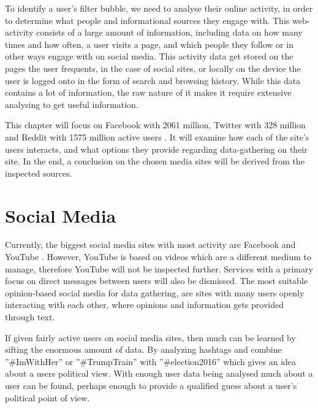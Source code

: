 
To identify a user's filter bubble, we need to analyse their online activity, in
order to determine what people and informational sources they engage with. This
web-activity consists of a large amount of information, including data on how
many times and how often, a user visits a page, and which people they follow or
in other ways engage with on social media. This activity data get stored on the
pages the user frequents, in the case of social sites, or locally on the device
the user is logged onto in the form of search and browsing history. While this
data contains a lot of information, the raw nature of it makes it require
extensive analysing to get useful information.\nl


This chapter will focus on Facebook with 2061 million, Twitter with 328 million
and Reddit with 1575 million active users \citep{SocialMediaStats, RedditStats}.
It will examine how each of the site's users interacts, and what options they
provide regarding data-gathering on their site. In the end, a conclusion on the
chosen media sites will be derived from the inspected sources.

\section{Social Media}
Currently, the biggest social media sites with most activity are Facebook and
YouTube \citep{SocialMediaStats}. However, YouTube is based on videos which are
a different medium to manage, therefore YouTube will not be inspected further.
Services with a primary focus on direct messages between users will also be
dismissed. The most suitable opinion-based social media for data gathering, are
sites with many users openly interacting with each other, where opinions and
information gets provided through text.\nl

If given fairly active users on social media sites, then much can be learned by
sifting the enormous amount of data. By analyzing hashtags and combine
”\#ImWithHer” or ”\#TrumpTrain” with ”\#election2016” which gives an idea about
a users political view. With enough user data being analysed much about a user
can be found, perhaps enough to provide a qualified guess about a user's
political point of view.\nl



